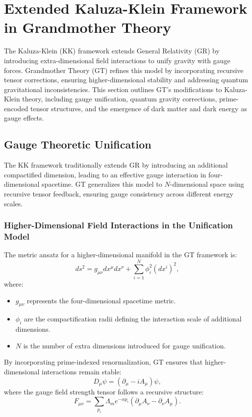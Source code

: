 \documentclass{article}
\theoremstyle{plain}
\begin{document}
\section{Extended Kaluza-Klein Framework in Grandmother Theory}

The Kaluza-Klein (KK) framework extends General Relativity (GR) by introducing extra-dimensional field interactions to unify gravity with gauge forces. Grandmother Theory (GT) refines this model by incorporating recursive tensor corrections, ensuring higher-dimensional stability and addressing quantum gravitational inconsistencies. This section outlines GT’s modifications to Kaluza-Klein theory, including gauge unification, quantum gravity corrections, prime-encoded tensor structures, and the emergence of dark matter and dark energy as gauge effects.

\subsection{Gauge Theoretic Unification}
The KK framework traditionally extends GR by introducing an additional compactified dimension, leading to an effective gauge interaction in four-dimensional spacetime. GT generalizes this model to $N$-dimensional space using recursive tensor feedback, ensuring gauge consistency across different energy scales.

\subsubsection{Higher-Dimensional Field Interactions in the Unification Model}
The metric ansatz for a higher-dimensional manifold in the GT framework is:
\begin{equation}
ds^2 = g_{\mu\nu} dx^{\mu} dx^{\nu} + \sum_{i=1}^{N} \phi_i^2 (dx^i)^2,
\end{equation}
where:
\begin{itemize}
\item $g_{\mu\nu}$ represents the four-dimensional spacetime metric.
\item $\phi_i$ are the compactification radii defining the interaction scale of additional dimensions.
\item $N$ is the number of extra dimensions introduced for gauge unification.
\end{itemize}

By incorporating prime-indexed renormalization, GT ensures that higher-dimensional interactions remain stable:
\begin{equation}
D_{\mu} \psi = (\partial_{\mu} - i A_{\mu}) \psi,
\end{equation}
where the gauge field strength tensor follows a recursive structure:
\begin{equation}
F_{\mu\nu} = \sum_{p_i} \Lambda_m e^{-\alpha p_i} (\partial_{\mu} A_{\nu} - \partial_{\nu} A_{\mu}).
\end{equation}
\end{document}
